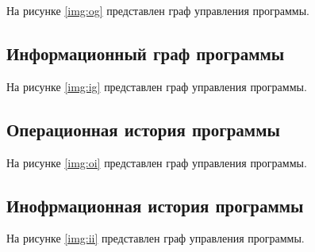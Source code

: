 На рисунке \ref{img:og} представлен граф управления программы.


\clearpage


\subsection{Информационный граф программы}

На рисунке \ref{img:ig} представлен граф управления программы.


\clearpage

\subsection{Операционная история программы}

На рисунке \ref{img:oi} представлен граф управления программы.


\clearpage

\subsection{Инофрмационная история программы}

На рисунке \ref{img:ii} представлен граф управления программы.


\clearpage


